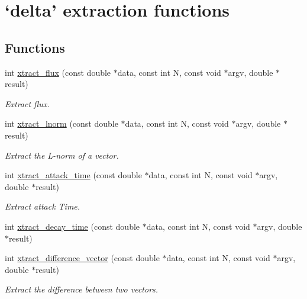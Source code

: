 \hypertarget{group__delta}{\section{`delta' extraction functions}
\label{group__delta}
}
\subsection*{Functions}
\begin{DoxyCompactItemize}
\item 
int \hyperlink{group__delta_ga54f1c5462916defb559290fd906cf8fd}{xtract\-\_\-flux} (const double $\ast$data, const int N, const void $\ast$argv, double $\ast$result)
\begin{DoxyCompactList}\small\item\em Extract flux. \end{DoxyCompactList}\item 
int \hyperlink{group__delta_ga2f26ae1ce452ffa381c173238b540ebb}{xtract\-\_\-lnorm} (const double $\ast$data, const int N, const void $\ast$argv, double $\ast$result)
\begin{DoxyCompactList}\small\item\em Extract the L-\/norm of a vector. \end{DoxyCompactList}\item 
\hypertarget{group__delta_ga4e56735218c21725d3f8a147c60cf0d9}{int \hyperlink{group__delta_ga4e56735218c21725d3f8a147c60cf0d9}{xtract\-\_\-attack\-\_\-time} (const double $\ast$data, const int N, const void $\ast$argv, double $\ast$result)}\label{group__delta_ga4e56735218c21725d3f8a147c60cf0d9}

\begin{DoxyCompactList}\small\item\em Extract attack Time. \end{DoxyCompactList}\item 
int \hyperlink{group__delta_ga87a7e72a9fd205d355a62c04d09e7c9e}{xtract\-\_\-decay\-\_\-time} (const double $\ast$data, const int N, const void $\ast$argv, double $\ast$result)
\item 
int \hyperlink{group__delta_gad20620a6cf18986d82fe0b05feadcd0e}{xtract\-\_\-difference\-\_\-vector} (const double $\ast$data, const int N, const void $\ast$argv, double $\ast$result)
\begin{DoxyCompactList}\small\item\em Extract the difference between two vectors. \end{DoxyCompactList}\end{DoxyCompactItemize}


